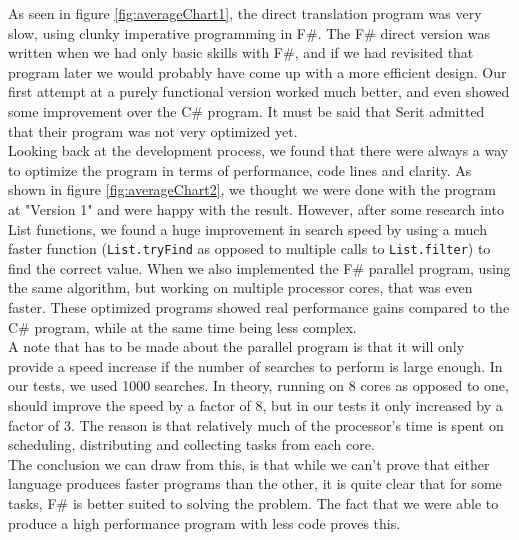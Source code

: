 \documentclass[12pt, a4paper]{article}
\newcommand{\code}[1]{{\small \texttt{#1}}}
\begin{document}
As seen in figure \ref{fig:averageChart1}, the direct translation program was very slow, using clunky imperative programming in F\#. The F\# direct version was written when we had only basic skills with F\#, and if we had revisited that program later we would probably have come up with a more efficient design. Our first attempt at a purely functional version worked much better, and even showed some improvement over the C\# program. It must be said that Serit admitted that their program was not very optimized yet.\\

Looking back at the development process, we found that there were always a way to optimize the program in terms of performance, code lines and clarity. As shown in figure \ref{fig:averageChart2}, we thought we were done with the program at "Version 1" and were happy with the result. However, after some research into List functions, we found a huge improvement in search speed by using a much faster function (\code{List.tryFind} as opposed to multiple calls to \code{List.filter}) to find the correct value. When we also implemented the F\# parallel program, using the same algorithm, but working on multiple processor cores, that was even faster. These optimized programs showed real performance gains compared to the C\# program, while at the same time being less complex.\\

A note that has to be made about the parallel program is that it will only provide a speed increase if the number of searches to perform is large enough. In our tests, we used 1000 searches. In theory, running on 8 cores as opposed to one, should improve the speed by a factor of 8, but in our tests it only increased by a factor of 3. The reason is that relatively much of the processor's time is spent on scheduling, distributing and collecting tasks from each core.\\

The conclusion we can draw from this, is that while we can't prove that either language produces faster programs than the other, it is quite clear that for some tasks, F\# is better suited to solving the problem. The fact that we were able to produce a high performance program with less code proves this.
\end{document}
